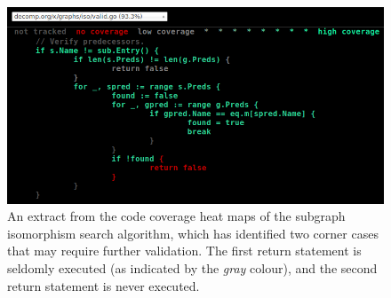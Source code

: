 \begin{figure}[htbp]
	\begin{center}
		\includegraphics[width=\textwidth]{inc/8_ver/iso_heat_map.png}
		\caption{An extract from the code coverage heat maps of the subgraph isomorphism search algorithm, which has identified two corner cases that may require further validation. The first return statement is seldomly executed (as indicated by the \textit{gray} colour), and the second return statement is never executed.}
		\label{fig:iso_heat_map}
	\end{center}
\end{figure}
